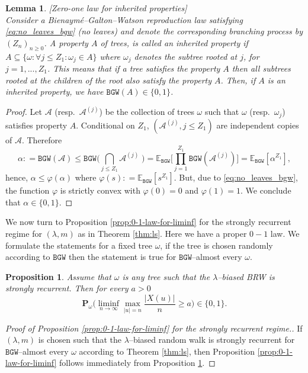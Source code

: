 \documentclass[11 pt]{article}
\newtheorem{lemma}[theorem]{Lemma}
\newtheorem{proposition}[theorem]{Proposition}
\theoremstyle{definition}
\numberwithin{equation}{section}
\newcommand{\EE}{\mathbb{E}} %
\newcommand{\Pw}{\mathbf{P}_{\omega}} %
\begin{document}
\begin{lemma}\label{lem:inherited}[Zero-one law for inherited properties]\\
 Consider a Bienaymé--Galton--Watson reproduction law satisfying \eqref{eq:no_leaves_bgw} (no leaves) and denote the 
 corresponding branching process by $(Z_n)_{n\geq 0}$.
A property $A$ of trees, is called an inherited property if 
$A \subseteq \{\omega: \forall j\leq Z_1: \omega_j \in A\}$ where $\omega_j$ denotes the subtree rooted at $j$, for $j = 1, ...,Z_1$. This means that if a tree satisfies the property $A$ then all subtrees rooted at the children of the root also satisfy the property $A$. Then, if $A$ is an inherited property, we have $\mathtt{BGW}(A) \in \{0,1\}$.
\end{lemma}
\begin{proof}
Let $\mathcal{A}$ (resp.\ $\mathcal{A}^{(j)}$) be the collection of trees $\omega$ such that  $\omega$ (resp.\ $\omega_j$) satisfies property $A$.
Conditional on $Z_1$, $(\mathcal{A}^{(j)},j\leq Z_1)$ are independent copies of $\mathcal{A}$. Therefore
\[
\alpha: = \mathtt{BGW}(\mathcal{A}) \leq \mathtt{BGW}\bigg(\bigcap_{j\leq Z_1} \mathcal{A}^{(j)} \;\bigg)= \EE_\mathtt{BGW}\bigg[ \prod_{j=1}^{Z_1}\mathtt{BGW}( \mathcal{A}^{(j)})\bigg]
= \EE_\mathtt{BGW}[\alpha^{Z_1}],
\]
hence, $\alpha\leq \varphi(\alpha)$ where $\varphi(s): = \EE_\mathtt{BGW}[s^{Z_1}]$. But, due to \eqref{eq:no_leaves_bgw}, the function $\varphi$ is strictly convex with $\varphi(0) =0$ and $\varphi(1) =1$. We conclude that $\alpha \in \{0,1\}$.
\end{proof}
We now turn to Proposition \ref{prop:0-1-law-for-liminf} for the strongly recurrent regime for $(\lambda, m)$ as in Theorem \ref{thm:ls}. Here we have a proper $0-1$ law. We formulate the statements for a fixed tree $\omega$, if the tree is chosen randomly according to $\mathtt{BGW}$ then the statement is true for $\mathtt{BGW}$--almost every $\omega$.

 \begin{proposition}\label{prop:rec}
 	Assume that $\omega$ is any tree such that the $\lambda$--biased BRW is strongly recurrent.  
 	Then for every $a>0$
	\begin{equation*}
		\Pw \Big(	\liminf_{n\to \infty} \max_{\vert u \vert = n}\frac{\vert X(u) \vert}{n}   \ge a\Big)\in \{0,1\}.
	\end{equation*}
 \end{proposition}

\begin{proof}[Proof of Proposition \ref{prop:0-1-law-for-liminf} for the strongly recurrent regime.] If $(\lambda, m)$ is chosen such that the $\lambda$--biased random walk is strongly recurrent for $\mathtt{BGW}$--almost every $\omega$ according to Theorem \ref{thm:ls}, then Proposition \ref{prop:0-1-law-for-liminf} follows immediately from Proposition \ref{prop:rec}.
\end{proof}
\end{document}
